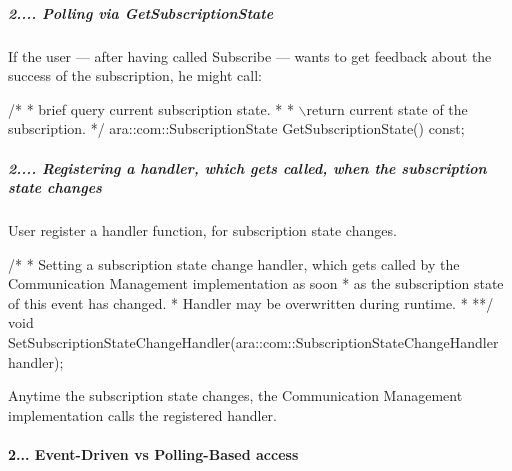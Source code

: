 \subparagraph*{2.... Polling via Get\+Subscription\+State}


\begin{DoxyItemize}
\item If the user — after having called Subscribe — wants to get feedback about the success of the subscription, he might call\+: 
\begin{DoxyCode}
\textcolor{comment}{/*}
\textcolor{comment}{ * brief query current subscription state.}
\textcolor{comment}{ *}
\textcolor{comment}{ * \(\backslash\)return current state of the subscription.}
\textcolor{comment}{ */}
ara::com::SubscriptionState GetSubscriptionState() \textcolor{keyword}{const};
\end{DoxyCode}

\end{DoxyItemize}

\subparagraph*{2.... Registering a handler, which gets called, when the subscription state changes}


\begin{DoxyItemize}
\item User register a handler function, for subscription state changes. 
\begin{DoxyCode}
\textcolor{comment}{/*}
\textcolor{comment}{ * Setting a subscription state change handler, which gets called by}
\textcolor{comment}{   the Communication Management implementation as soon}
\textcolor{comment}{ * as the subscription state of this event has changed.}
\textcolor{comment}{ * Handler may be overwritten during runtime.}
\textcolor{comment}{ *}
\textcolor{comment}{ **/}
 \textcolor{keywordtype}{void} SetSubscriptionStateChangeHandler(ara::com::SubscriptionStateChangeHandler handler);
\end{DoxyCode}

\item Anytime the subscription state changes, the Communication Management implementation calls the registered handler.
\end{DoxyItemize}

\paragraph*{2... Event-\/\+Driven vs Polling-\/\+Based access}


